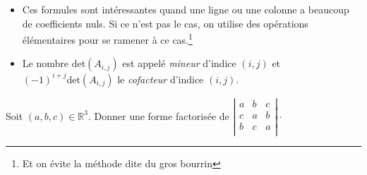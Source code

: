 \documentclass[french,11pt,twoside]{VcCours}
\begin{document}
\begin{Remarques}{}
\begin{itemize} 
\item Ces formules sont intéressantes quand une ligne ou une colonne a beaucoup de coefficients nuls. Si ce n'est pas le cas, on utilise des opérations élémentaires pour se ramener à ce cas.\footnote{Et on évite la méthode dite \og du gros bourrin \fg }
\item Le nombre $\textrm{det}(A_{i,j})$ est appelé \emph{mineur} d'indice $(i,j)$ et $(-1)^{i+j}\textrm{det}(A_{i,j})$ le \emph{cofacteur} d'indice $(i,j)$.
\end{itemize}
\end{Remarques}{}


\begin{Exemple} Soit $(a,b,c) \in \mathbb{R}^3$. Donner une forme factorisée de $\left\vert \begin{array}{ccc}
a & b & c \\
c & a & b \\
b & c & a \\
\end{array} \right\vert \cdot$
%
%

\end{Exemple}
\end{document}
